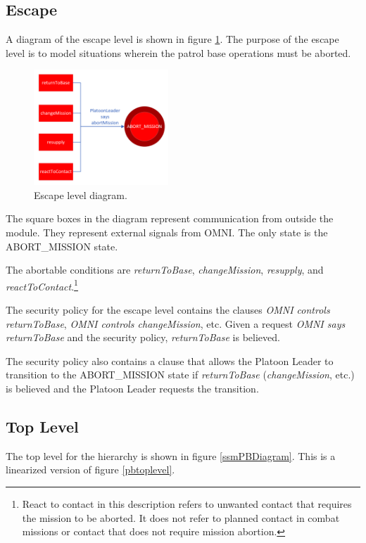 \documentclass[../../main/main.tex]{subfiles}
\begin{document}
\subsection{Escape}\label{ssec:escape}
A diagram of the escape level is shown in figure \ref{escapeDiagram}.  The purpose of the escape level is to model situations wherein the patrol base operations must be aborted.  

\begin{figure}[h!]
\centering
\includegraphics[width=0.45\textwidth]{../figures/escapeDiagram}
\caption{\label{escapeDiagram} Escape level diagram.}
\end{figure}

The square boxes in the diagram represent communication from outside the module.  They represent external signals from OMNI.  The only state is the ABORT_MISSION state. 

The abortable conditions are \textit{returnToBase}, \textit{changeMission}, \textit{resupply}, and \textit{reactToContact}.\footnote{React to contact in this description refers to unwanted contact that requires the mission to be aborted.  It does not refer to planned contact in combat missions or contact that does not require mission abortion.}


The security policy for the escape level contains the clauses \textit{OMNI controls returnToBase}, \textit{OMNI controls changeMission}, etc.  Given a request \textit{OMNI says returnToBase} and the security policy, \textit{returnToBase} is believed.  

The security policy also contains a clause that allows the Platoon Leader to transition to the ABORT_MISSION state if \textit{returnToBase} (\textit{changeMission}, etc.)  is believed and the Platoon Leader requests the transition.


 \clearpage

\subsection{Top Level}\label{ssec:toplevel}
The top level for the hierarchy is shown in figure \ref{ssmPBDiagram}.  This is a linearized version of figure \ref{pbtoplevel}.
\end{document}
